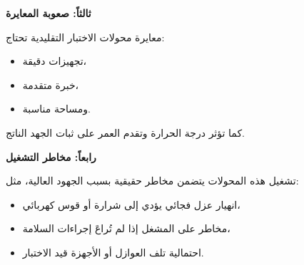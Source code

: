 \documentclass[a4paper, 14pt]{extarticle} %
\begin{document}
    \vspace{8pt}
    \textbf{ثالثاً: صعوبة المعايرة}

    \vspace{10pt}
    معايرة محولات الاختبار التقليدية تحتاج:
    \begin{itemize}
      \item 
      تجهيزات دقيقة،
      \item 
      خبرة متقدمة،
      \item 
      ومساحة مناسبة.
    \end{itemize}
    كما تؤثر درجة الحرارة وتقدم العمر على ثبات الجهد الناتج.
    
    \vspace{8pt}
    \textbf{رابعاً: مخاطر التشغيل}

    \vspace{10pt}
    تشغيل هذه المحولات يتضمن مخاطر حقيقية بسبب الجهود العالية، مثل:
    \begin{itemize}
      \item 
      انهيار عزل فجائي يؤدي إلى شرارة أو قوس كهربائي،
      \item 
      مخاطر على المشغل إذا لم تُراعَ إجراءات السلامة،
      \item 
      احتمالية تلف العوازل أو الأجهزة قيد الاختبار.
    \end{itemize}

    
    
\end{document}
